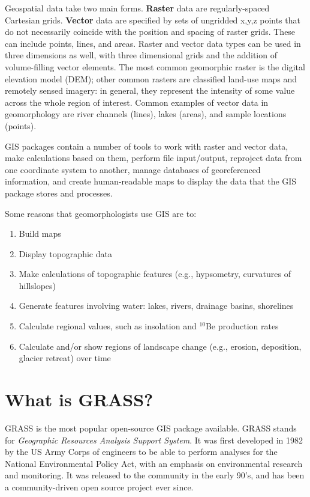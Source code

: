 \documentclass{book}
\begin{document}
Geospatial data take two main forms. {\bf Raster} data are regularly-spaced Cartesian grids. {\bf Vector} data are specified by sets of ungridded x,y,z points that do not necessarily coincide with the position and spacing of raster grids. These can include points, lines, and areas. Raster and vector data types can be used in three dimensions as well, with three dimensional grids and the addition of volume-filling vector elements. The most common geomorphic raster is the digital elevation model (DEM); other common rasters are classified land-use maps and remotely sensed imagery: in general, they represent the intensity of some value across the whole region of interest. Common examples of vector data in geomorphology are river channels (lines), lakes (areas), and sample locations (points).

GIS packages contain a number of tools to work with raster and vector data, make calculations based on them, perform file input/output, reproject data from one coordinate system to another, manage databases of georeferenced information, and create human-readable maps to display the data that the GIS package stores and processes.

Some reasons that geomorphologists use GIS are to:
\begin{enumerate}
	\item Build maps
	\item Display topographic data
	\item Make calculations of topographic features (e.g., hypsometry, curvatures of hillslopes)
	\item Generate features involving water: lakes, rivers, drainage basins, shorelines
	\item Calculate regional values, such as insolation and $^{10}$Be production rates
	\item Calculate and/or show regions of landscape change (e.g., erosion, deposition, glacier retreat) over time
\end{enumerate}

\section{What is GRASS?}

GRASS is the most popular open-source GIS package available. GRASS stands for \emph{Geographic Resources Analysis Support System}. It was first developed in 1982 by the US Army Corps of engineers to be able to perform analyses for the National Environmental Policy Act, with an emphasis on environmental research and monitoring. It was released to the community in the early 90's, and has been a community-driven open source project ever since.
\end{document}
